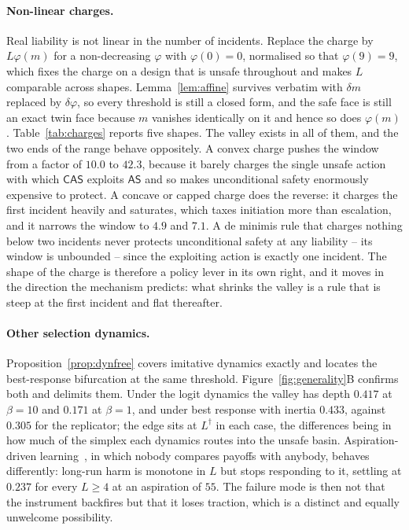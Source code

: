 \documentclass[11pt,a4paper]{article}
\theoremstyle{definition}
\newcommand{\AS}{\textsf{AS}}
\newcommand{\CAS}{\textsf{CAS}}
\begin{document}
\paragraph{Non-linear charges.}
Real liability is not linear in the number of incidents. Replace the charge by
$L\varphi(m)$ for a non-decreasing $\varphi$ with $\varphi(0)=0$,
normalised so that $\varphi(9)=9$, which fixes the charge on a design that is
unsafe throughout and makes $L$ comparable across shapes. Lemma~\ref{lem:affine}
survives verbatim with $\delta m$ replaced by $\delta\varphi$, so every
threshold is still a closed form, and the safe face is still an exact twin
face because $m$ vanishes identically on it and hence so does $\varphi(m)$.
Table~\ref{tab:charges} reports five shapes. The valley exists in all of them,
and the two ends of the range behave oppositely. A convex charge pushes the
window from a factor of $10.0$ to $42.3$, because it barely charges the single
unsafe action with which $\CAS$ exploits $\AS$ and so makes unconditional
safety enormously expensive to protect. A concave or capped charge does the
reverse: it charges the first incident heavily and saturates, which taxes
initiation more than escalation, and it narrows the window to $4.9$ and $7.1$.
A de minimis rule that charges nothing below two incidents never protects
unconditional safety at any liability -- its window is unbounded -- since the
exploiting action is exactly one incident. The shape of the charge is
therefore a policy lever in its own right, and it moves in the direction the
mechanism predicts: what shrinks the valley is a rule that is steep at the
first incident and flat thereafter.



\paragraph{Other selection dynamics.}
Proposition~\ref{prop:dynfree} covers imitative dynamics exactly and locates
the best-response bifurcation at the same threshold.
Figure~\ref{fig:generality}B confirms both and delimits them. Under the logit
dynamics the valley has depth $0.417$ at
$\beta=10$ and $0.171$ at $\beta=1$, and under best response with inertia
$0.433$, against $0.305$ for the replicator; the edge sits at $L^{\dagger}$ in
each case, the differences being in how much of the simplex each dynamics
routes into the unsafe basin. Aspiration-driven learning~\citep{posch1999aspiration}, in which nobody compares payoffs with
anybody, behaves differently: long-run harm is monotone
in $L$ but stops responding to it, settling at $0.237$ for every $L\ge4$ at an
aspiration of $55$. The failure mode is then not that the instrument backfires
but that it loses traction, which is a distinct and equally unwelcome
possibility.
\end{document}
